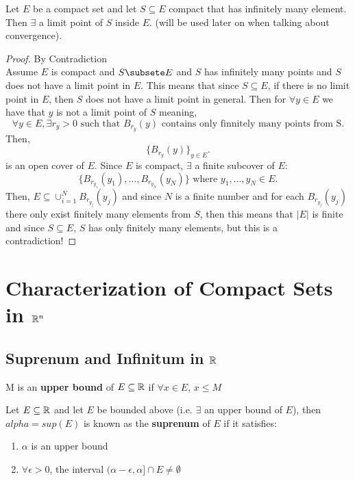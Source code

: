 \documentclass[a4paper]{article}
\begin{document}
\begin{prop}
  Let $E$ be a compact set and let  $S \subseteq E$ compact that has infinitely many element. Then  $\exists $
  a limit point of $S$ inside $E$. (will be used later on when talking about convergence).
  \begin{proof}{By Contradiction}\\
    Assume $E$ is compact and  $S \subsete E$ and  $S$ has infinitely many points and  $S$ does not have a 
    limit point in  $E$. This means that since $S \subseteq E$, if there is no limit point in $E$,
    then $S$ does not have a limit point in general. Then for $\forall y \in E$ we have that  $y$ is not
    a limit point of  $S$ meaning, 
     \[
        \forall y \in E, \exists r_y > 0 \text{ such that } B_{r_y} (y) \text{ contains only finnitely many points from S}
    .\] 
    Then, 
    \[
    \{B_{r_y} \left( y \right) \}_{y \in E}
    .\] 
    is an open cover of $E$. Since $E$ is compact, $\exists $ a finite subcover of $E$:
     \[
       \{ B_{r_{y_1}} (y_1), \ldots, B_{r_{y_N}}(y_N) \} \text{ where } y_1,\ldots,y_N \in E 
     .\] 
     Then, $E \subseteq \cup_{i=1}^N B_{r_{y_j}}(y_j)$ and since $N$ is a finite number and for each  $B_{r_{y_j}}(y_j)$ 
     there only exist finitely many elements from $S$, then this means that $|E|$ is finite and since $S \subseteq E$,
      $S$ has only finitely many elements, but this is a contradiction!
  \end{proof}
\end{prop}

\section{Characterization of Compact Sets in $\mathbb{R}^n$}

\subsection{Suprenum and Infinitum in $\mathbb{R}$}
\begin{definition}
  M is an \textbf{upper bound} of $E \subseteq \mathbb{R}$ if $\forall x \in E$,  $x \leq M$
\end{definition}

\begin{definition}
  Let  $E \subseteq \mathbb{R}$ and let $E$ be bounded above (i.e.  $\exists $ an upper bound of $E$), then
  $alpha = sup(E)$ is known as the \textbf{suprenum} of $E$ if it satisfies:
    \begin{enumerate}
     \item $\alpha$ is an upper bound
     \item  $\forall \epsilon > 0$, the interval $(\alpha - \epsilon, \alpha] \cap E \neq \emptyset$
   \end{enumerate}
\end{definition}
\end{document}
